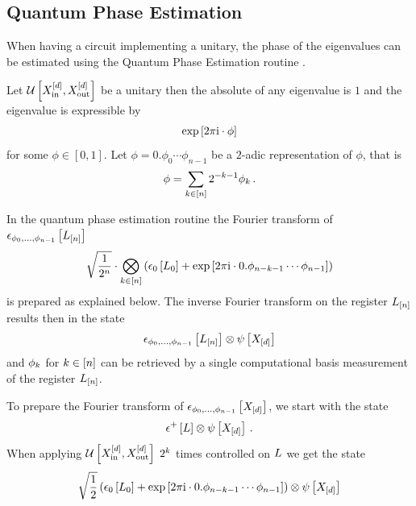 
\subsection{Quantum Phase Estimation}\label{sec:quantumPhaseEstimation}

When having a circuit implementing a unitary, the phase of the eigenvalues can be estimated using the Quantum Phase Estimation routine \cite{kitaev_quantum_1995, cleve_quantum_1998}.

Let $\mathcal{U}\left[X_{\mathrm{in}}^{[d]},X_{\mathrm{out}}^{[d]}\right]$ be a unitary then the absolute of any eigenvalue is $1$ and the eigenvalue is expressible by
\begin{align*}
    \mathrm{exp}\left[2\pi\mathrm{i} \cdot \phi\right]
\end{align*}
for some $\phi\in[0,1]$.
Let $\phi=0.\phi_{0}\cdots\phi_{n-1}$ be a $2$-adic representation of $\phi$, that is
\begin{align*}
    \phi
    = \sum_{k\in[n]} 2^{-k-1} \phi_{k} \, .
\end{align*}

In the quantum phase estimation routine the Fourier transform of $\epsilon_{\phi_0,...,\phi_{n-1}}\left[L_{[n]}\right]$
\begin{align*}
    \sqrt{\frac{1}{2^{n}}} \cdot \bigotimes_{k\in[n]} \left(\epsilon_{0}\left[L_{0}\right] + \mathrm{exp}\left[2\pi\mathrm{i} \cdot 0.\phi_{n-k-1}\cdots\phi_{n-1}\right]\right)
\end{align*}
is prepared as explained below.
The inverse Fourier transform on the register $L_{[n]}$ results then in the state
\begin{align*}
    \epsilon_{\phi_0,...,\phi_{n-1}}\left[L_{[n]}\right] \otimes \psi\left[X_{[d]}\right]
\end{align*}
and $\phi_{k}$ for $k\in[n]$ can be retrieved by a single computational basis measurement of the register $L_{[n]}$.

To prepare the Fourier transform of $\epsilon_{\phi_0,...,\phi_{n-1}}\left[X_{[d]}\right]$, we start with the state
\begin{align*}
    \epsilon^{+}\left[L\right] \otimes \psi\left[X_{[d]}\right] \, .
\end{align*}
When applying $\mathcal{U}\left[X_{\mathrm{in}}^{[d]},X_{\mathrm{out}}^{[d]}\right]$ $2^{k}$ times controlled on $L$ we get the state
\begin{align*}
    \sqrt{\frac{1}{2}} \left(\epsilon_{0}\left[L_{0}\right] + \mathrm{exp}\left[2\pi\mathrm{i} \cdot 0.\phi_{n-k-1}\cdots\phi_{n-1}\right]\right) \otimes \psi\left[X_{[d]}\right]
\end{align*}

